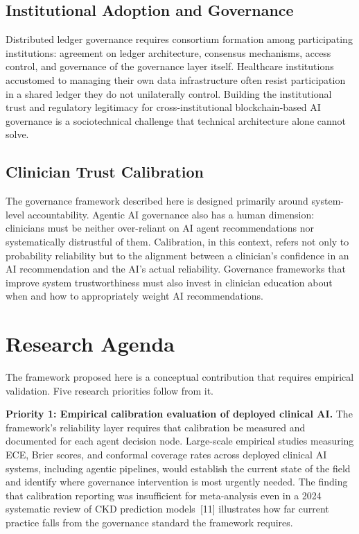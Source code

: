 \subsection{Institutional Adoption and
Governance}\label{institutional-adoption-and-governance}

Distributed ledger governance requires consortium formation among
participating institutions: agreement on ledger architecture, consensus
mechanisms, access control, and governance of the governance layer
itself. Healthcare institutions accustomed to managing their own data
infrastructure often resist participation in a shared ledger they do not
unilaterally control. Building the institutional trust and regulatory
legitimacy for cross-institutional blockchain-based AI governance is a
sociotechnical challenge that technical architecture alone cannot solve.

\subsection{Clinician Trust
Calibration}\label{clinician-trust-calibration}

The governance framework described here is designed primarily around
system-level accountability. Agentic AI governance also has a human
dimension: clinicians must be neither over-reliant on AI agent
recommendations nor systematically distrustful of them. Calibration, in
this context, refers not only to probability reliability but to the
alignment between a clinician's confidence in an AI recommendation and
the AI's actual reliability. Governance frameworks that improve system
trustworthiness must also invest in clinician education about when and
how to appropriately weight AI recommendations.


\section{Research Agenda}\label{research-agenda}

The framework proposed here is a conceptual contribution that requires
empirical validation. Five research priorities follow from it.

\textbf{Priority 1: Empirical calibration evaluation of deployed
clinical AI.} The framework's reliability layer requires that
calibration be measured and documented for each agent decision node.
Large-scale empirical studies measuring ECE, Brier scores, and conformal
coverage rates across deployed clinical AI systems, including agentic
pipelines, would establish the current state of the field and identify
where governance intervention is most urgently needed. The finding that
calibration reporting was insufficient for meta-analysis even in a 2024
systematic review of CKD prediction models~{[}11{]} illustrates how far
current practice falls from the governance standard the framework
requires.

